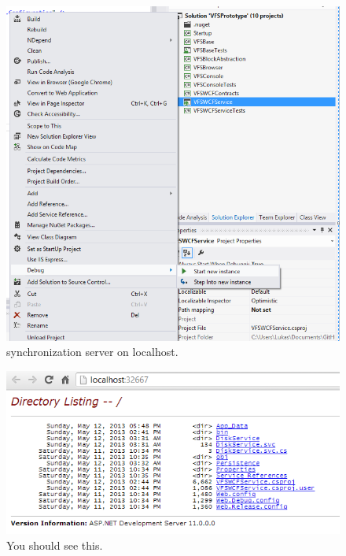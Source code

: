 \documentclass[JCDReport.tex]{subfiles}
\begin{document}
\begin{figure}[h!]
	\centering
	\includegraphics[scale=0.75]{Images/tutorial/1.png} 
	\caption{synchronization server on localhost.}
\end{figure}	

\begin{figure}[h!]
	\centering
	\includegraphics[scale=0.75]{Images/tutorial/2.png} 
	\caption{You should see this.}
\end{figure}
\end{document}

